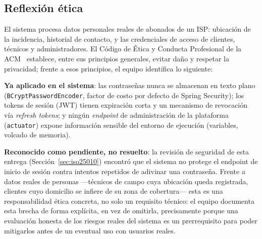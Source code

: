 \subsection{Reflexión ética}

El sistema procesa datos personales reales de abonados de un ISP: ubicación de la incidencia,
historial de contacto, y las credenciales de acceso de clientes, técnicos y administradores. El
Código de Ética y Conducta Profesional de la ACM~\cite{acm2018ethics} establece, entre sus
principios generales, evitar daño y respetar la privacidad; frente a esos principios, el equipo
identifica lo siguiente:

\textbf{Ya aplicado en el sistema}: las contraseñas nunca se almacenan en texto plano
(\texttt{BCryptPasswordEncoder}, factor de costo por defecto de Spring Security); los tokens de
sesión (JWT) tienen expiración corta y un mecanismo de revocación vía \emph{refresh tokens}; y
ningún \emph{endpoint} de administración de la plataforma (\texttt{actuator}) expone información
sensible del entorno de ejecución (variables, volcado de memoria).

\textbf{Reconocido como pendiente, no resuelto}: la revisión de seguridad de esta entrega
(Sección~\ref{sec:iso25010}) encontró que el sistema no protege el endpoint de inicio de sesión
contra intentos repetidos de adivinar una contraseña. Frente a datos reales de personas —técnicos
de campo cuya ubicación queda registrada, clientes cuyo domicilio se infiere de su zona de
cobertura— esta es una responsabilidad ética concreta, no solo un requisito técnico: el equipo
documenta esta brecha de forma explícita, en vez de omitirla, precisamente porque una evaluación
honesta de los riesgos reales del sistema es un prerrequisito para poder mitigarlos antes de un
eventual uso con usuarios reales.
